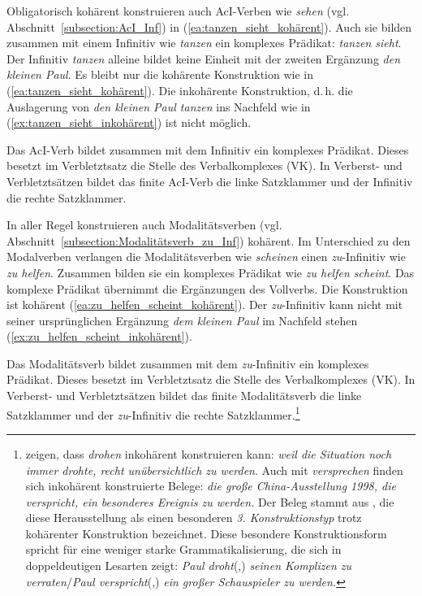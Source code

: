Obligatorisch kohärent konstruieren auch AcI-Verben wie \textit{sehen} (vgl. Abschnitt~\ref{subsection:AcI_Inf}) in (\ref{ea:tanzen_sieht_kohärent}). Auch sie bilden zusammen mit einem Infinitiv wie \textit{tanzen} ein komplexes Prädikat: \textit{tanzen sieht}. Der Infinitiv \textit{tanzen} alleine bildet keine Einheit mit der zweiten Ergänzung \textit{den kleinen Paul}. Es bleibt nur die kohärente Konstruktion wie in (\ref{ea:tanzen_sieht_kohärent}). Die inkohärente Konstruktion, d.\,h. die Auslagerung von \textit{den kleinen Paul tanzen} ins Nachfeld wie in (\ref{ex:tanzen_sieht_inkohärent}) ist nicht möglich.

\ea 
{}\label{ea:tanzen_sieht_kohärent}
\label{ex:tanzen_sieht_inkohärent}
\z 
\z

Das AcI-Verb bildet zusammen mit dem Infinitiv ein komplexes Prädikat. Dieses besetzt im Verbletztsatz die Stelle des Verbalkomplexes (VK). In Verberst- und Verbletztsätzen bildet das finite AcI-Verb die linke Satzklammer und der Infinitiv die rechte Satzklammer.

In aller Regel konstruieren auch Modalitätsverben (vgl. Abschnitt~\ref{subsection:Modalitätsverb_zu_Inf}) kohärent. Im Unterschied zu den Modalverben verlangen die Modalitätsverben wie \textit{scheinen} einen \textit{zu}-Infinitiv wie \textit{zu helfen}. Zusammen bilden sie ein komplexes Prädikat wie \textit{zu helfen scheint}. Das komplexe Prädikat übernimmt die Ergänzungen des Vollverbs. Die Konstruktion ist kohärent (\ref{ea:zu_helfen_scheint_kohärent}). Der \textit{zu}-Infinitiv kann nicht mit seiner ursprünglichen Ergänzung \textit{dem kleinen Paul} im Nachfeld stehen (\ref{ex:zu_helfen_scheint_inkohärent}). 

\ea 
{}\label{ea:zu_helfen_scheint_kohärent}
\label{ex:zu_helfen_scheint_inkohärent}
\z 
\z

Das Modalitätsverb bildet zusammen mit dem \textit{zu}-Infinitiv ein komplexes Prädikat. Dieses besetzt im Verbletztsatz die Stelle des Verbalkomplexes (VK). In Verberst- und Verbletztsätzen bildet das finite Modalitätsverb die linke Satzklammer und der \textit{zu}-Infinitiv die rechte Satzklammer.\footnote{\citet[1283]{ZifHoffStr1997} zeigen, dass \textit{drohen} inkohärent konstruieren kann: \textit{weil die Situation noch immer drohte, recht unübersichtlich zu werden}. Auch mit \textit{versprechen} finden sich inkohärent konstruierte Belege: \textit{die große China-Ausstellung 1998, die verspricht, ein besonderes Ereignis zu werden.} Der Beleg stammt aus \citet[137]{Reis2005}, die diese Herausstellung als einen besonderen \textit{3. Konstruktionstyp} trotz kohärenter Konstruktion bezeichnet. Diese besondere Konstruktionsform spricht für eine weniger starke Grammatikalisierung, die sich in doppeldeutigen Lesarten zeigt: \textit{Paul droht}(,) \textit{seinen Komplizen zu verraten}/\textit{Paul verspricht}(,) \textit{ein großer Schauspieler zu werden.}}

